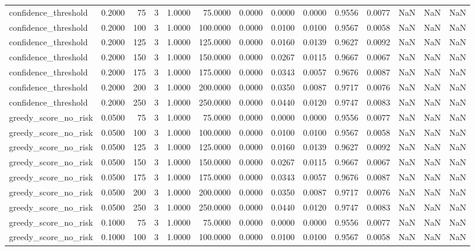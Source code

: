 \begin{tabular}{lrrrrrrrrrrrrr}
confidence_threshold & 0.2000 & 75 & 3 & 1.0000 & 75.0000 & 0.0000 & 0.0000 & 0.0000 & 0.9556 & 0.0077 & NaN & NaN & NaN \\
confidence_threshold & 0.2000 & 100 & 3 & 1.0000 & 100.0000 & 0.0000 & 0.0100 & 0.0100 & 0.9567 & 0.0058 & NaN & NaN & NaN \\
confidence_threshold & 0.2000 & 125 & 3 & 1.0000 & 125.0000 & 0.0000 & 0.0160 & 0.0139 & 0.9627 & 0.0092 & NaN & NaN & NaN \\
confidence_threshold & 0.2000 & 150 & 3 & 1.0000 & 150.0000 & 0.0000 & 0.0267 & 0.0115 & 0.9667 & 0.0067 & NaN & NaN & NaN \\
confidence_threshold & 0.2000 & 175 & 3 & 1.0000 & 175.0000 & 0.0000 & 0.0343 & 0.0057 & 0.9676 & 0.0087 & NaN & NaN & NaN \\
confidence_threshold & 0.2000 & 200 & 3 & 1.0000 & 200.0000 & 0.0000 & 0.0350 & 0.0087 & 0.9717 & 0.0076 & NaN & NaN & NaN \\
confidence_threshold & 0.2000 & 250 & 3 & 1.0000 & 250.0000 & 0.0000 & 0.0440 & 0.0120 & 0.9747 & 0.0083 & NaN & NaN & NaN \\
greedy_score_no_risk & 0.0500 & 75 & 3 & 1.0000 & 75.0000 & 0.0000 & 0.0000 & 0.0000 & 0.9556 & 0.0077 & NaN & NaN & NaN \\
greedy_score_no_risk & 0.0500 & 100 & 3 & 1.0000 & 100.0000 & 0.0000 & 0.0100 & 0.0100 & 0.9567 & 0.0058 & NaN & NaN & NaN \\
greedy_score_no_risk & 0.0500 & 125 & 3 & 1.0000 & 125.0000 & 0.0000 & 0.0160 & 0.0139 & 0.9627 & 0.0092 & NaN & NaN & NaN \\
greedy_score_no_risk & 0.0500 & 150 & 3 & 1.0000 & 150.0000 & 0.0000 & 0.0267 & 0.0115 & 0.9667 & 0.0067 & NaN & NaN & NaN \\
greedy_score_no_risk & 0.0500 & 175 & 3 & 1.0000 & 175.0000 & 0.0000 & 0.0343 & 0.0057 & 0.9676 & 0.0087 & NaN & NaN & NaN \\
greedy_score_no_risk & 0.0500 & 200 & 3 & 1.0000 & 200.0000 & 0.0000 & 0.0350 & 0.0087 & 0.9717 & 0.0076 & NaN & NaN & NaN \\
greedy_score_no_risk & 0.0500 & 250 & 3 & 1.0000 & 250.0000 & 0.0000 & 0.0440 & 0.0120 & 0.9747 & 0.0083 & NaN & NaN & NaN \\
greedy_score_no_risk & 0.1000 & 75 & 3 & 1.0000 & 75.0000 & 0.0000 & 0.0000 & 0.0000 & 0.9556 & 0.0077 & NaN & NaN & NaN \\
greedy_score_no_risk & 0.1000 & 100 & 3 & 1.0000 & 100.0000 & 0.0000 & 0.0100 & 0.0100 & 0.9567 & 0.0058 & NaN & NaN & NaN \\
\bottomrule
\end{tabular}
